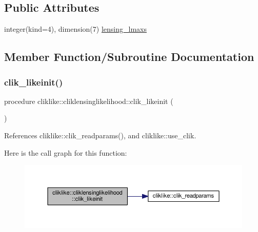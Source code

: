 \subsection*{Public Attributes}
\begin{DoxyCompactItemize}
\item 
integer(kind=4), dimension(7) \mbox{\hyperlink{structcliklike_1_1cliklensinglikelihood_a9a82c64f795e769f631396177fd0e6d2}{lensing\+\_\+lmaxs}}
\end{DoxyCompactItemize}


\subsection{Member Function/\+Subroutine Documentation}
\mbox{\label{structcliklike_1_1cliklensinglikelihood_ac4a38b9586c81e8e9c036b3891e5f5c3}} 
\subsubsection{\texorpdfstring{clik\+\_\+likeinit()}{clik\_likeinit()}}
{\footnotesize\ttfamily procedure cliklike\+::cliklensinglikelihood\+::clik\+\_\+likeinit (\begin{DoxyParamCaption}{ }\end{DoxyParamCaption})}



References cliklike\+::clik\+\_\+readparams(), and cliklike\+::use\+\_\+clik.

Here is the call graph for this function\+:
\nopagebreak
\begin{figure}[H]
\begin{center}
\leavevmode
\includegraphics[width=350pt]{structcliklike_1_1cliklensinglikelihood_ac4a38b9586c81e8e9c036b3891e5f5c3_cgraph}
\end{center}
\end{figure}
\mbox{\label{structcliklike_1_1cliklensinglikelihood_a12ec49fc557e262c9ac8319c9392ddd6}} 
